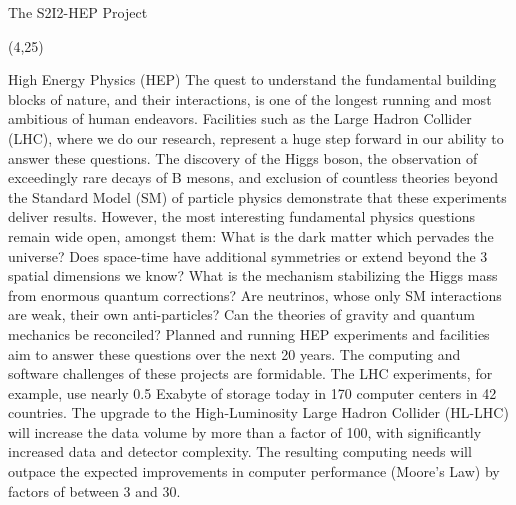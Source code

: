 \documentclass[final]{beamer}
\begin{document}
\begin{frame}{}
\begin{textblock}{78.0}
\begin{block}{The S2I2-HEP Project}
\end{block}
\end{textblock}

\begin{textblock}{38.0}(4,25)
\begin{block}{High Energy Physics (HEP)}
The quest to understand the fundamental building blocks of nature,
and their interactions, is one of the longest running and most
ambitious of human endeavors. Facilities such as the Large Hadron
Collider (LHC), where we do our research, represent a huge step
forward in our ability to answer these questions. The discovery of
the Higgs boson, the observation of exceedingly rare decays of B
mesons, and exclusion of countless theories beyond the Standard
Model (SM) of particle physics demonstrate that these experiments
deliver results. However, the most interesting fundamental physics
questions remain wide open, amongst them: What is the dark matter
which pervades the universe? Does space-time have additional
symmetries or extend beyond the 3 spatial dimensions we know? What
is the mechanism stabilizing the Higgs mass from enormous quantum
corrections? Are neutrinos, whose only SM interactions are weak,
their own anti-particles? Can the theories of gravity and quantum
mechanics be reconciled? Planned and running HEP experiments 
and facilities aim to answer these questions over the next 20 years. 
The computing and software challenges of these projects are formidable. 
The LHC experiments, for example, use nearly 0.5 Exabyte of
storage today in 170 computer centers in 42 countries. 
The upgrade to the High-Luminosity Large Hadron Collider (HL-LHC) will
increase the data volume
by more than a factor of 100, with significantly increased data and detector complexity. The resulting computing needs will outpace the expected improvements in computer performance (Moore's Law) by factors of between 3 and 30. 


\end{block}
\end{textblock}
\end{frame}
\end{document}
